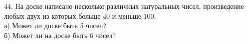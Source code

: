 44. На доске написано несколько различных натуральных чисел, произведение любых
двух из которых больше 40 и меньше 100.\\
а) Может ли доске быть 5 чисел?\\
б) Может ли на доске быть 6 чисел?\\
